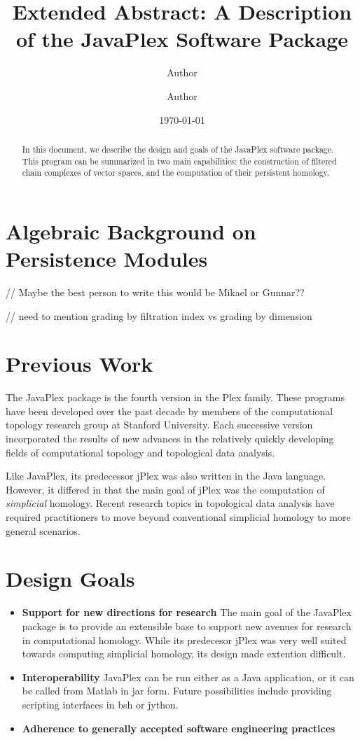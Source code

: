\documentclass[10pt]{article}
\title{Extended Abstract: A Description of the JavaPlex Software Package}
\author[1,*]{Author}
\author[2]{Author}
\affil[1]{Affiliation}
\affil[2]{Affiliation}
\date{\today}
\begin{document}
\maketitle

\let\oldthefootnote\thefootnote
\renewcommand{\thefootnote}{\fnsymbol{footnote}}
\let\thefootnote\oldthefootnote

\begin{abstract}
In this document, we describe the design and goals of the JavaPlex software package. This program can be summarized in two main capabilities: the construction of filtered chain complexes of vector spaces, and the computation of their persistent homology.
\end{abstract}

\section{Algebraic Background on Persistence Modules}

// Maybe the best person to write this would be Mikael or Gunnar??

// need to mention grading by filtration index vs grading by dimension

\section{Previous Work}

The JavaPlex package is the fourth version in the Plex family. These programs have been developed over the past decade by members of the computational topology research group at Stanford University. Each successive version incorporated the results of new advances in the relatively quickly developing fields of computational topology and topological data analysis.

Like JavaPlex, its predecessor jPlex was also written in the Java language. However, it differed in that the main goal of jPlex was the computation of \emph{simplicial} homology. Recent research topics in topological data analysis have required practitioners to move beyond conventional simplicial homology to more general scenarios.

\section{Design Goals}
\begin{itemize}
\item {\bf Support for new directions for research} The main goal of the JavaPlex package is to provide an extensible base to support new avenues for research in computational homology. While its predecesor jPlex was very well suited towards computing simplicial homology, its design made extention difficult.
\item {\bf Interoperability} JavaPlex can be run either as a Java application, or it can be called from Matlab in jar form. Future possibilities include providing scripting interfaces in bsh or jython.
\item {\bf Adherence to generally accepted software engineering practices}
\end{itemize}
\end{document}

